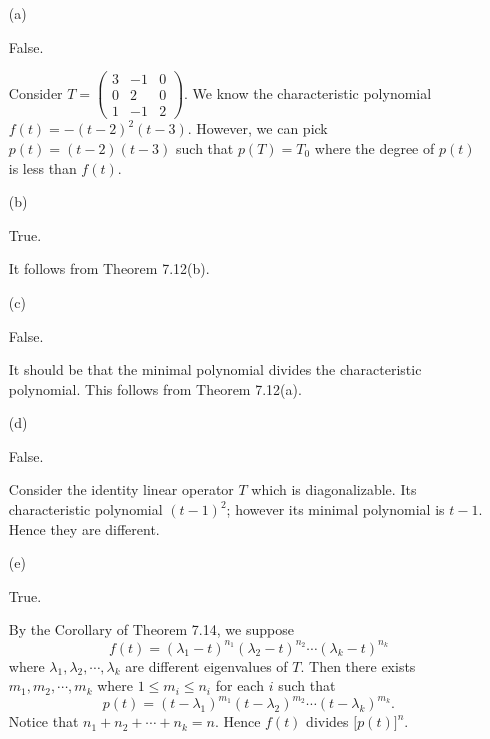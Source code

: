 \begin{Exercise}
\begin{enumerate}[(a)]
\item[(a)]
\begin{answer}
False.
\end{answer}
\begin{solution}
Consider $T = \begin{pmatrix}
3 & -1 & 0 \\
0 & 2 & 0 \\
1 & -1 & 2
\end{pmatrix}$. We know the characteristic polynomial $f(t) = -(t-2)^2 (t-3)$. 
However, we can pick $p(t) = (t-2)(t-3)$ such that $p(T) = T_0$ where the degree of $p(t)$ is less than $f(t)$.
\end{solution}

\item[(b)]
\begin{answer}
True.
\end{answer}
\begin{solution}
It follows from Theorem 7.12(b).
\end{solution}

\item[(c)]
\begin{answer}
False.
\end{answer}
\begin{solution}
It should be that the minimal polynomial divides the characteristic polynomial. This follows from Theorem 7.12(a).
\end{solution}

\item[(d)]
\begin{answer}
False.
\end{answer}
\begin{solution}
Consider the identity linear operator $T$ which is diagonalizable. Its characteristic polynomial $(t-1)^2$; however its minimal polynomial is $t-1$. 
Hence they are different.
\end{solution}

\item[(e)]
\begin{answer}
True.
\end{answer}
\begin{solution}
By the Corollary of Theorem 7.14, we suppose 
$$
f(t) = (\lambda_1-t)^{n_1} (\lambda_2-t)^{n_2} \cdots (\lambda_k-t)^{n_k}
$$
where $\lambda_1, \lambda_2, \cdots, \lambda_k$ are different eigenvalues of $T$. Then there exists $m_1, m_2, \cdots, m_k$ where $1\leq m_i \leq n_i$ for each $i$ such that
$$
p(t) = (t-\lambda_1)^{m_1} (t-\lambda_2)^{m_2} \cdots (t-\lambda_k)^{m_k}.
$$
Notice that $n_1+n_2+\cdots+n_k = n$. 
Hence $f(t)$ divides $ \big[p(t)\big]^n$.
\end{solution}


\end{enumerate}
\end{Exercise}
